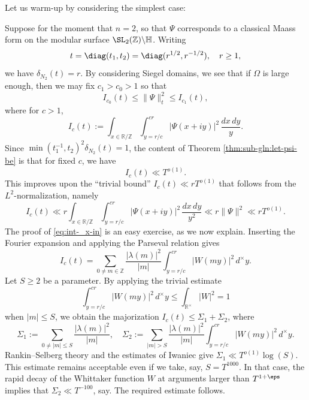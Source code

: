 Let us warm-up by considering the simplest case:
\begin{example}\label{example:growth-bound-sl2-cusp}
  Suppose for the moment that $n = 2$, so that $\Psi$ corresponds to a classical Maass form on the modular surface $\SL_2(\mathbb{Z}) \backslash \mathbb{H}$.  Writing
  \[
    t = \diag(t_1, t_2) = \diag(r^{1/2}, r^{-1/2}),
    \quad r \geq 1,
  \]
  we have $\delta_{N_2}(t) = r$.  By considering Siegel domains, we see that if $\Omega$ is large enough, then we may fix $c_1 > c_0 > 1$ so that
  \begin{equation*}
    I_{c_0}(t) \leq \lVert \Psi \rVert_t^2 \leq I_{c_1}(t),
  \end{equation*}
  where for $c > 1$,
  \begin{equation*}
    I_c(t) := \int_{x \in \mathbb{R} / \mathbb{Z}} \int_{y = r/c}^{c r} \lvert \Psi(x + i y) \rvert^2 \, \frac{d x \, d y}{y}.
  \end{equation*}
  Since $\min(t_1^{-1}, t_2)^2 \delta_{N_2}(t) = 1$, the content of Theorem \ref{thm:sub-gln:let-psi-be} is that for fixed $c$, we have
  \begin{equation}\label{eq:int-_x-in}
    I_c(t)
    \ll T^{o(1)}.
  \end{equation}
  This improves upon the ``trivial bound'' $I_c(t) \ll r T^{o(1)}$ that follows from the $L^2$-normalization, namely
  \begin{equation*}
    I_c(t) \ll r \int_{x \in \mathbb{R} / \mathbb{Z}}
    \int_{y = r/c}^{c r} \lvert \Psi(x + i y) \rvert^2 \, \frac{d x \, d y}{y^2}
    \ll r \lVert \Psi \rVert^2 \ll r T^{o(1)}.
  \end{equation*}
  The proof of \eqref{eq:int-_x-in} is an easy exercise, as we now explain.  Inserting the Fourier expansion and applying the Parseval relation gives
  \begin{equation*}
    I_c(t)
    =
    \sum_{0 \neq m \in \mathbb{Z} }
    \frac{|\lambda(m)|^2}{|m|}
    \int_{y = r/c}^{c r} |W(m y)|^2 \, d^\times y.
  \end{equation*}
  Let $S \geq 2$ be a parameter.  By applying the trivial estimate
  \begin{equation*}
    \int_{y=r/c}^{c r} |W(m y)|^2 \, d^\times y \leq \int_{\mathbb{R}^\times} |W|^2 = 1
  \end{equation*}
  when $|m| \leq S$, we obtain the majorization $I_c(t) \leq \Sigma_1 + \Sigma_2$, where
  \begin{equation*}
    \Sigma_1 :=  \sum_{0 \neq |m| \leq S}
    \frac{|\lambda(m)|^2}{|m|},
    \quad
    \Sigma_2 :=
    \sum_{|m| > S}
    \frac{|\lambda(m)|^2}{|m|}
    \int_{y = r/c}^{c r} |W(m y)|^2 \, d^\times y.
  \end{equation*}
  Rankin--Selberg theory and the estimates of Iwaniec \cite{MR1067982} give $\Sigma_1 \ll T^{o(1)} \log(S)$.  This estimate remains acceptable even if we take, say, $S = T^{1000}$.  In that case, the rapid decay of the Whittaker function $W$ at arguments larger than $T^{1+\eps}$ implies that $\Sigma_2 \ll T^{-100}$, say.  The required estimate follows.
\end{example}
